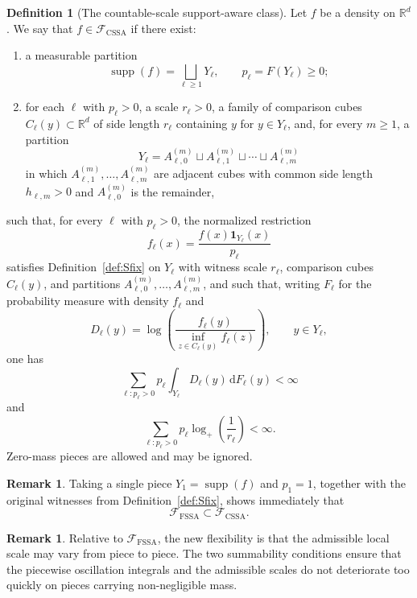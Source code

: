 \documentclass[11pt]{article}
\theoremstyle{definition}
\newtheorem{definition}[theorem]{Definition}
\newtheorem{remark}[theorem]{Remark}
\begin{document}
\begin{definition}[The countable-scale support-aware class]
\label{def:Scnt}
Let $f$ be a density on $\mathbb{R}^d$. We say that $f\in\mathcal F_{\mathrm{CSSA}}$ if there exist:
\begin{enumerate}[label=\textnormal{(\roman*)}]
    \item a measurable partition
    \[
    \operatorname{supp}(f)=\bigsqcup_{\ell\ge1} Y_\ell,
    \qquad
    p_\ell=F(Y_\ell)\ge0;
    \]
    \item for each $\ell$ with $p_\ell>0$, a scale $r_\ell>0$, a family of comparison cubes $C_\ell(y)\subset \mathbb{R}^d$ of side length $r_\ell$ containing $y$ for $y\in Y_\ell$, and, for every $m\ge1$, a partition
    \[
    Y_\ell=A^{(m)}_{\ell,0}\sqcup A^{(m)}_{\ell,1}\sqcup\cdots\sqcup A^{(m)}_{\ell,m}
    \]
    in which $A^{(m)}_{\ell,1},\dots,A^{(m)}_{\ell,m}$ are adjacent cubes with common side length $h_{\ell,m}>0$ and $A^{(m)}_{\ell,0}$ is the remainder,
\end{enumerate}
such that, for every $\ell$ with $p_\ell>0$, the normalized restriction
\[
f_\ell(x)=\frac{f(x)\mathbf{1}_{Y_\ell}(x)}{p_\ell}
\]
satisfies Definition~\ref{def:Sfix} on $Y_\ell$ with witness scale $r_\ell$, comparison cubes $C_\ell(y)$, and partitions $A^{(m)}_{\ell,0},\dots,A^{(m)}_{\ell,m}$, and such that, writing $F_\ell$ for the probability measure with density $f_\ell$ and
\[
D_\ell(y)=\log\!\left(\frac{f_\ell(y)}{\inf_{z\in C_\ell(y)} f_\ell(z)}\right),
\qquad y\in Y_\ell,
\]
one has
\[
\sum_{\ell:p_\ell>0} p_\ell\int_{Y_\ell} D_\ell(y)\,\mathrm{d}F_\ell(y)<\infty
\]
and
\[
\sum_{\ell:p_\ell>0} p_\ell\log_+\!\left(\frac{1}{r_\ell}\right)<\infty.
\]
Zero-mass pieces are allowed and may be ignored.
\end{definition}

\begin{remark}
Taking a single piece $Y_1=\operatorname{supp}(f)$ and $p_1=1$, together with the original witnesses from Definition~\ref{def:Sfix}, shows immediately that
\[
\mathcal F_{\mathrm{FSSA}}\subset \mathcal F_{\mathrm{CSSA}}.
\]
\end{remark}

\begin{remark}
Relative to $\mathcal F_{\mathrm{FSSA}}$, the new flexibility is that the admissible local scale may vary from piece to piece. The two summability conditions ensure that the piecewise oscillation integrals and the admissible scales do not deteriorate too quickly on pieces carrying non-negligible mass.
\end{remark}
\end{document}
